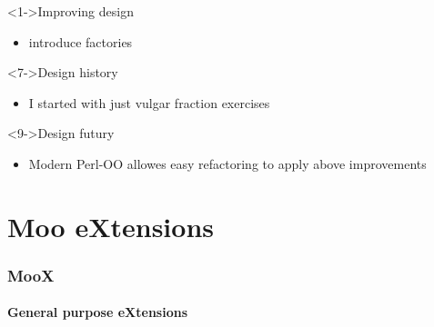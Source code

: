 \documentclass[ngerman,xcolor={table,dvipsnames},smaller,compress,hyperref={bookmarks,colorlinks}]{beamer}
\begin{document}
\begin{frame}[t,fragile]

\begin{block}<1->{Improving design}
\begin{itemize}
\item introduce factories
\end{itemize}
\end{block}

\begin{block}<7->{Design history}
\begin{itemize}
\item I started with just vulgar fraction exercises
\end{itemize}
\end{block}

\begin{block}<9->{Design futury}
\begin{itemize}
\item Modern Perl-OO allowes easy refactoring to apply above improvements
\end{itemize}
\end{block}

\end{frame}

\part{Moo eXtensions}

\section{MooX}

\subsection{General purpose eXtensions}
\end{document}
